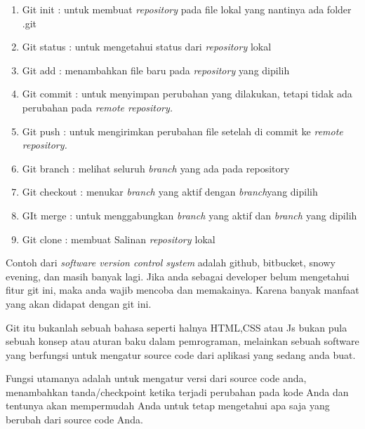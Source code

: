 \begin{enumerate}
\item Git init : untuk membuat $  $\textit{repository} $  $pada file lokal yang nantinya ada folder .git \par
\noindent 
\item Git status : untuk mengetahui status dari $  $\textit{repository} $  $lokal \par
\noindent 
\item Git add : menambahkan file baru pada $  $\textit{repository} $  $yang dipilih \par
\noindent 
\item Git commit : untuk menyimpan perubahan yang dilakukan, tetapi tidak ada perubahan pada $  $\textit{remote repository.} \par
\noindent 
\item Git push : untuk mengirimkan perubahan file setelah di commit ke $  $\textit{remote repository.} \par
\noindent 
\item Git branch : melihat seluruh $  $\textit{branch $  $}yang ada pada repository \par
\noindent 
\item Git checkout : menukar $  $\textit{branch $  $}yang aktif dengan $  $\textit{branch}yang dipilih \par
\noindent 
\item GIt merge : untuk menggabungkan $  $\textit{branch $  $}yang aktif dan $  $\textit{branch $  $}yang dipilih \par
\noindent 
\item Git clone : membuat Salinan $  $\textit{repository $  $}lokal\end{enumerate}
 \par
 \vspace{\baselineskip}
\noindent 
Contoh dari $  $\textit{software version control system} $  $adalah github, bitbucket, snowy evening, dan masih banyak lagi. Jika anda sebagai developer belum mengetahui fitur git ini, maka anda wajib mencoba dan memakainya. Karena banyak manfaat yang akan didapat dengan git ini. \par
\vspace{\baselineskip}
\noindent 
Git itu bukanlah sebuah bahasa seperti halnya HTML,CSS atau Js bukan pula sebuah konsep atau aturan baku dalam pemrograman, melainkan sebuah software yang berfungsi untuk mengatur source code dari aplikasi yang sedang anda buat. \par
\noindent 
Fungsi utamanya adalah untuk mengatur versi dari source code anda, menambahkan tanda/checkpoint ketika terjadi perubahan pada kode Anda dan tentunya akan mempermudah Anda untuk tetap mengetahui apa saja yang berubah dari source code Anda. \par

